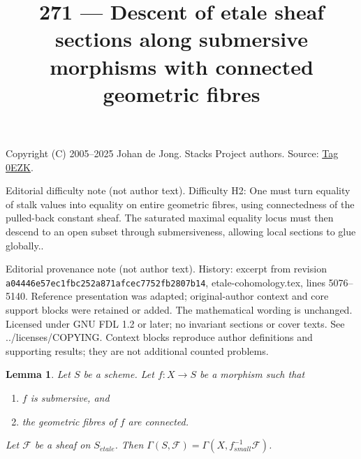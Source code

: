 \documentclass{amsart}
\theoremstyle{plain}
\newtheorem{lemma}[subsection]{Lemma}
\theoremstyle{definition}
\theoremstyle{remark}
\numberwithin{equation}{subsection}
\def\etale{{\acute{e}tale}}
\begin{document}
\title[Stacks Project, Tag 0EZK]{271 --- Descent of etale sheaf sections along submersive morphisms with connected geometric fibres}
\maketitle
\noindent Copyright (C) 2005--2025 Johan de Jong. Stacks Project authors. Source: \href{https://stacks.math.columbia.edu/tag/0EZK}{Tag 0EZK}.

\noindent Editorial difficulty note (not author text). Difficulty H2: One must turn equality of stalk values into equality on entire geometric fibres, using connectedness of the pulled-back constant sheaf. The saturated maximal equality locus must then descend to an open subset through submersiveness, allowing local sections to glue globally..

\noindent Editorial provenance note (not author text). History: excerpt from revision \texttt{a0444\allowbreak 6e57e\allowbreak c1fbc\allowbreak 252a8\allowbreak 71afc\allowbreak ec775\allowbreak 2fb28\allowbreak 07b14}, etale-cohomology.tex, lines 5076--5140. Reference presentation was adapted; original-author context and core support blocks were retained or added. The mathematical wording is unchanged. Licensed under GNU FDL 1.2 or later; no invariant sections or cover texts. See ../licenses/COPYING. Context blocks reproduce author definitions and supporting results; they are not additional counted problems.

\begin{lemma}
\label{lemma-sections-upstairs-submersive}
Let $S$ be a scheme. Let $f : X \to S$ be a morphism such that
\begin{enumerate}
\item $f$ is submersive, and
\item the geometric fibres of $f$ are connected.
\end{enumerate}
Let $\mathcal{F}$ be a sheaf on $S_\etale$.
Then $\Gamma(S, \mathcal{F}) = \Gamma(X, f^{-1}_{small}\mathcal{F})$.
\end{lemma}
\end{document}
